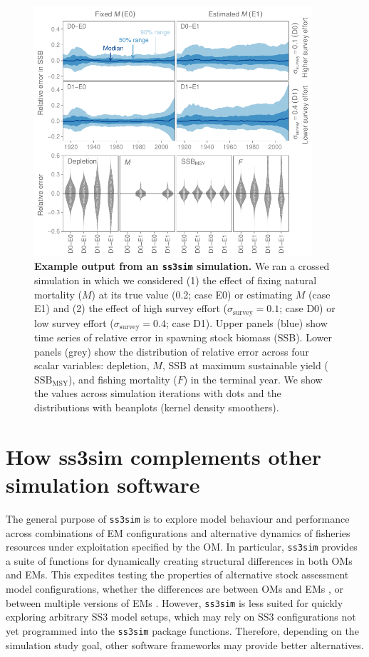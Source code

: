 \documentclass[12pt]{article}
\begin{document}
\begin{figure}[htb]
\begin{center}
\includegraphics[width=4.06in]{fig2-20131109.pdf}
\end{center}
\caption{
{\bf Example output from an \texttt{ss3sim} simulation.}
We ran a crossed simulation in which we considered
(1) the effect of fixing natural mortality ($M$)
at its true value (0.2; case E0) or estimating $M$ (case E1) and
(2) the effect of high survey effort
($\sigma_\mathrm{survey} = 0.1$; case D0)
or low survey effort ($\sigma_\mathrm{survey} = 0.4$; case D1).
Upper panels (blue) show time series of relative error
in spawning stock biomass (SSB).
Lower panels (grey) show the distribution
of relative error across four scalar variables:
depletion, $M$, SSB at maximum sustainable yield ($\mathrm{SSB}_\mathrm{MSY}$),
and fishing mortality ($F$) in the terminal year.
We show the values across simulation iterations with dots
and the distributions with beanplots (kernel density smoothers).
}
\label{fig:results}
\end{figure}

\section*{How ss3sim complements other simulation software}

The general purpose of \texttt{ss3sim} is to explore model behaviour and performance across combinations of EM configurations and alternative dynamics of fisheries resources under exploitation specified by the OM. In particular, \texttt{ss3sim} provides a suite of functions for dynamically creating structural differences in both OMs and EMs. This expedites testing the properties of alternative stock assessment model configurations, whether the differences are between OMs and EMs \cite{johnson2013}, or between multiple versions of EMs \cite{ono2013}. However, \texttt{ss3sim} is less suited for quickly exploring arbitrary SS3 model setups, which may rely on SS3 configurations not yet programmed into the \texttt{ss3sim} package functions. Therefore, depending on the simulation study goal, other software frameworks may provide better alternatives.
\end{document}
